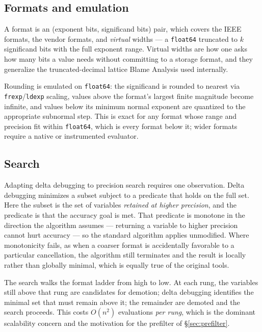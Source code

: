 \documentclass[11pt]{article}
\begin{document}
\subsection{Formats and emulation}
\label{sec:emulation}

A format is an (exponent bits, significand bits) pair, which covers the IEEE
formats, the vendor formats, and \emph{virtual} widths --- a \texttt{float64}
truncated to $k$ significand bits with the full exponent range. Virtual widths
are how one asks how many bits a value needs without committing to a storage
format, and they generalize the truncated-decimal lattice Blame Analysis used
internally.

Rounding is emulated on \texttt{float64}: the significand is rounded to nearest
via \texttt{frexp}/\texttt{ldexp} scaling, values above the format's largest
finite magnitude become infinite, and values below its minimum normal exponent
are quantized to the appropriate subnormal step. This is exact for any format
whose range and precision fit within \texttt{float64}, which is every format
below it; wider formats require a native or instrumented evaluator.

\subsection{Search}
\label{sec:search}

Adapting delta debugging to precision search requires one observation.
Delta debugging minimizes a subset subject to a predicate that holds on the full
set. Here the subset is the set of variables \emph{retained at higher precision},
and the predicate is that the accuracy goal is met. That predicate is monotone in
the direction the algorithm assumes --- returning a variable to higher precision
cannot hurt accuracy --- so the standard algorithm applies unmodified. Where
monotonicity fails, as when a coarser format is accidentally favorable to a
particular cancellation, the algorithm still terminates and the result is locally
rather than globally minimal, which is equally true of the original tools.

The search walks the format ladder from high to low. At each rung, the variables
still above that rung are candidates for demotion; delta debugging identifies the
minimal set that must remain above it; the remainder are demoted and the search
proceeds. This costs $O(n^2)$ evaluations \emph{per rung}, which is the dominant
scalability concern and the motivation for the prefilter of
\S\ref{sec:prefilter}.
\end{document}
